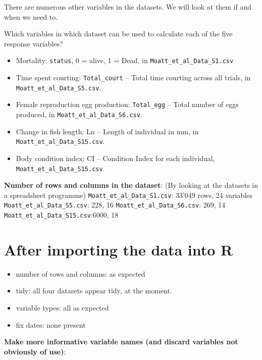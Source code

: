 \documentclass[]{book}
\providecommand{\tightlist}{%
  \setlength{\itemsep}{0pt}\setlength{\parskip}{0pt}}
\begin{document}
There are numerous other variables in the datasets. We will look at them if and when we need to.

Which variables in which dataset can be used to calculate each of the five response variables?

\begin{itemize}
\tightlist
\item
  Mortality: \texttt{status}, 0 = alive, 1 = Dead, in \texttt{Moatt\_et\_al\_Data\_S1.csv}
\item
  Time spent courting: \texttt{Total\_court} -- Total time courting across all trials, in \texttt{Moatt\_et\_al\_Data\_S5.csv}.
\item
  Female reproduction egg production: \texttt{Total\_egg} -- Total number of eggs produced, in \texttt{Moatt\_et\_al\_Data\_S6.csv}.
\item
  Change in fish length: Ln -- Length of individual in mm, in \texttt{Moatt\_et\_al\_Data\_S15.csv}.
\item
  Body condition index: CI -- Condition Index for each individual, \texttt{Moatt\_et\_al\_Data\_S15.csv}.
\end{itemize}

\textbf{Number of rows and columns in the dataset}:
(By looking at the datasets in a spreadsheet programme)
\texttt{Moatt\_et\_al\_Data\_S1.csv}: 33'049 rows, 24 variables
\texttt{Moatt\_et\_al\_Data\_S5.csv}: 228, 16
\texttt{Moatt\_et\_al\_Data\_S6.csv}: 269, 14
\texttt{Moatt\_et\_al\_Data\_S15.csv}:6000, 18

\hypertarget{after-importing-the-data-into-r}{%
\section{After importing the data into R}\label{after-importing-the-data-into-r}}

\begin{itemize}
\tightlist
\item
  number of rows and columns: as expected
\item
  tidy: all four datasets appear tidy, at the moment.
\item
  variable types: all as expected
\item
  fix dates: none present
\end{itemize}

\textbf{Make more informative variable names (and discard variables not obviously of use)}:
\end{document}
